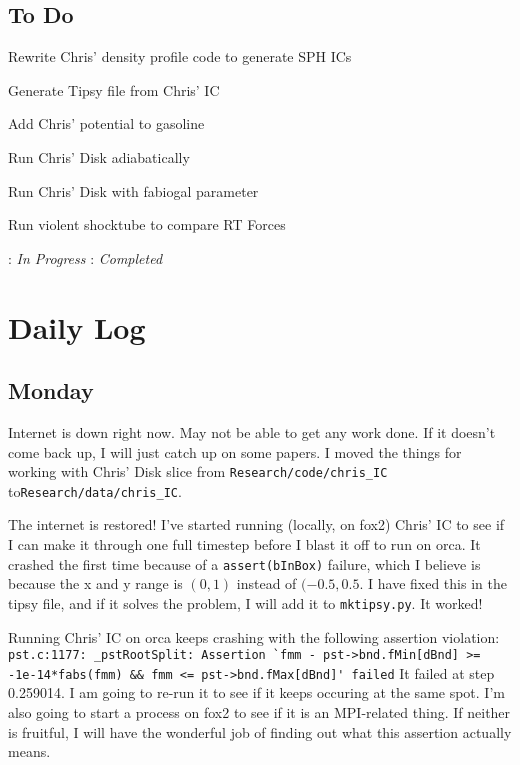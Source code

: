\documentclass[11pt,letterpaper]{article}
\begin{document}
\pagebreak
\subsection*{To Do}
\begin{bullets}
\item[\checkmark] Rewrite Chris' density profile code to generate SPH ICs
\item[\checkmark] Generate Tipsy file from Chris' IC
\item[\checkmark] Add Chris' potential to gasoline
\item[\checkmark] Run Chris' Disk adiabatically
\item Run Chris' Disk with fabiogal parameter
\item[\checkmark] Run violent shocktube to compare RT Forces
\end{bullets}

\textleaf : \textit{In Progress} \qquad \checkmark : \textit{Completed}

\section*{Daily Log}
\subsection*{Monday}
Internet is down right now.  May not be able to get any work done.  If it 
doesn't come back up, I will just catch up on some papers. I moved 
the things for working with Chris' Disk slice from \verb!Research/code/chris_IC!
to\verb!Research/data/chris_IC!.

The internet is restored!  I've started running (locally, on fox2) Chris' IC to
see if I can make it through one full timestep before I blast it off to run on
orca.  It crashed the first time because of a \verb!assert(bInBox)! failure,
which I believe is because the x and y range is $(0,1)$ instead of $(-0.5,0.5$.
I have fixed this in the tipsy file, and if it solves the problem, I will add 
it to \verb!mktipsy.py!.  It worked!

Running Chris' IC on orca keeps crashing with the following assertion 
violation:
\verb!pst.c:1177: _pstRootSplit: Assertion `fmm - pst->bnd.fMin[dBnd] >= -1e-14*fabs(fmm) && fmm <= pst->bnd.fMax[dBnd]' failed!
It failed at step 0.259014.  I am going to re-run it to see if it keeps
occuring at the same spot.  I'm also going to start a process on fox2
to see if it is an MPI-related thing.  If neither is fruitful, I will
have the wonderful job of finding out what this assertion actually 
means.
\end{document}
